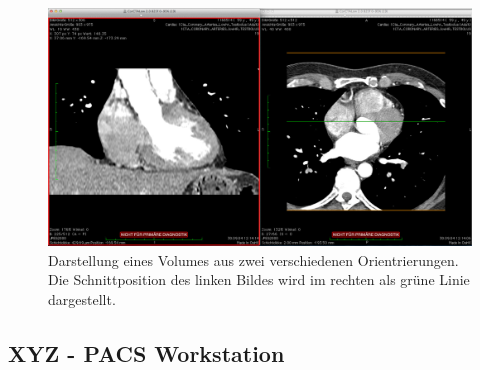 \begin{figure}[t]
	\centering
	\includegraphics[width=0.8\linewidth]{img/c2_osirix_2d_view_splitscreen.jpg}
	\caption{Darstellung eines Volumes aus zwei verschiedenen Orientrierungen. Die Schnittposition des linken Bildes wird im rechten als grüne Linie dargestellt. }
\end{figure}

\subsection{XYZ - PACS Workstation}
\label{sec:XYZ - PACS Workstation}



